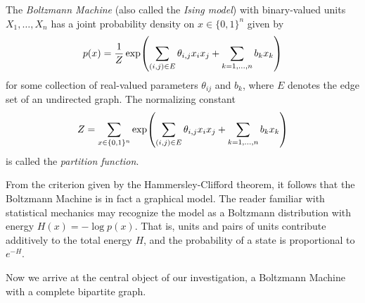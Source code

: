 \documentclass[cclicense]{hmcthesis}
\numberwithin{equation}{section}
\begin{document}
    \begin{definition}
        The \emph{Boltzmann Machine} (also called the \emph{Ising model}) with
        binary-valued units $X_1, \ldots, X_n$ has a joint probability density
        on $x \in \{0,1\}^n$ given by
        \[
            p(x)
            = \frac 1 Z \exp\pdel*{\sum_{(i,j) \in E} \theta_{i,j} x_i x_j +
            \sum_{k=1,\ldots,n} b_k x_k}
        \]
        for some collection of real-valued parameters $\theta_{ij}$ and $b_k$,
        where $E$ denotes the edge set of an undirected graph.  The normalizing
        constant
        \[
            Z = \sum_{x \in \{0,1\}^n} 
            \exp\pdel*{\sum_{(i,j) \in E} \theta_{i,j} x_i x_j +
                        \sum_{k=1,\ldots,n} b_k x_k}
        \]
        is called the \emph{partition function}.
    \end{definition}

    From the criterion given by the Hammersley-Clifford theorem, it follows that
    the Boltzmann Machine is in fact a graphical model.  The reader familiar
    with statistical mechanics may recognize the model as a Boltzmann
    distribution with energy $H(x) = -\log p(x)$.  That is, units and pairs of
    units contribute additively to the total energy $H$, and the probability of
    a state is proportional to $e^{-H}$.
    
    Now we arrive at the central object of our investigation, a Boltzmann
    Machine with a complete bipartite graph.
\end{document}

